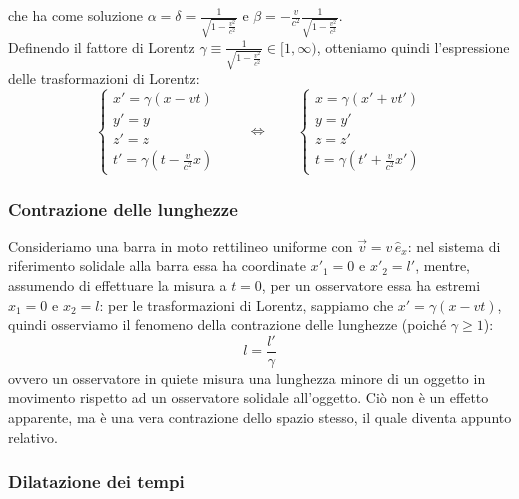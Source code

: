che ha come soluzione $ \alpha = \delta = \frac{1}{\sqrt{1 - \frac{v^2}{c^2}}} $ e $ \beta = -\frac{v}{c^2}\frac{1}{\sqrt{1 - \frac{v^2}{c^2}}} $. \\ 
%
Definendo il fattore di Lorentz $ \gamma \equiv \frac{1}{\sqrt{1 - \frac{v^2}{c^2}}} \in [1, \infty)$, otteniamo quindi l'espressione delle trasformazioni di Lorentz:
\begin{equation}
	\begin{cases}
		x' = \gamma \left(x - vt\right) \\ 
		y' = y \\ 
		z' = z \\ 
		t' = \gamma \left(t - \frac{v}{c^2} x\right)
	\end{cases}
	\qquad\Longleftrightarrow\qquad
		\begin{cases}
		x = \gamma \left(x' + vt'\right) \\ 
		y = y' \\ 
		z = z' \\ 
		t = \gamma \left(t' + \frac{v}{c^2} x'\right)
	\end{cases}
	\label{eq:6}
\end{equation}

\subsubsection{Contrazione delle lunghezze}

Consideriamo una barra in moto rettilineo uniforme con $ \vec{v} = v\,\hat{e}_x $: nel sistema di riferimento solidale alla barra essa ha coordinate $ x'_1 = 0 $ e $ x'_2 = l' $, mentre, assumendo di effettuare la misura a $ t = 0 $, per un osservatore essa ha estremi $ x_1 = 0 $ e $ x_2 = l $: per le trasformazioni di Lorentz, sappiamo che $ x' = \gamma (x - vt) $, quindi osserviamo il fenomeno della contrazione delle lunghezze (poiché $ \gamma \ge 1 $):
\begin{equation}
	l = \frac{l'}{\gamma}
	\label{eq:7}
\end{equation}
ovvero un osservatore in quiete misura una lunghezza minore di un oggetto in movimento rispetto ad un osservatore solidale all'oggetto. Ciò non è un effetto apparente, ma è una vera contrazione dello spazio stesso, il quale diventa appunto relativo.

\subsubsection{Dilatazione dei tempi}

